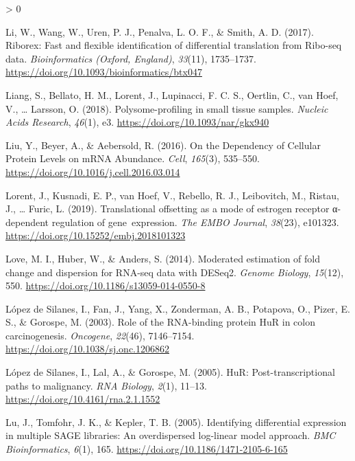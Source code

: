 \documentclass[
  12pt,
  openany]{book}
\newlength{\cslhangindent}
\newenvironment{CSLReferences}[2] %
 {%
  \setlength{\parindent}{0pt}
  \ifodd #1 \everypar{\setlength{\hangindent}{\cslhangindent}}\ignorespaces\fi
  \ifnum #2 > 0
  \setlength{\parskip}{#2\baselineskip}
  \fi
 }%
 {}
\begin{document}
\begin{CSLReferences}{1}{0}
\leavevmode\hypertarget{ref-Li2017}{}%
Li, W., Wang, W., Uren, P. J., Penalva, L. O. F., \& Smith, A. D. (2017). Riborex: Fast and flexible identification of differential translation from {Ribo}-seq data. \emph{Bioinformatics (Oxford, England)}, \emph{33}(11), 1735--1737. \url{https://doi.org/10.1093/bioinformatics/btx047}

\leavevmode\hypertarget{ref-Liang2018}{}%
Liang, S., Bellato, H. M., Lorent, J., Lupinacci, F. C. S., Oertlin, C., van Hoef, V., \ldots{} Larsson, O. (2018). Polysome-profiling in small tissue samples. \emph{Nucleic Acids Research}, \emph{46}(1), e3. \url{https://doi.org/10.1093/nar/gkx940}

\leavevmode\hypertarget{ref-Liu2016}{}%
Liu, Y., Beyer, A., \& Aebersold, R. (2016). On the {Dependency} of {Cellular Protein Levels} on {mRNA Abundance}. \emph{Cell}, \emph{165}(3), 535--550. \url{https://doi.org/10.1016/j.cell.2016.03.014}

\leavevmode\hypertarget{ref-Lorent2019}{}%
Lorent, J., Kusnadi, E. P., van Hoef, V., Rebello, R. J., Leibovitch, M., Ristau, J., \ldots{} Furic, L. (2019). Translational offsetting as a mode of estrogen receptor α-dependent regulation of gene~expression. \emph{The EMBO Journal}, \emph{38}(23), e101323. \url{https://doi.org/10.15252/embj.2018101323}

\leavevmode\hypertarget{ref-Love2014}{}%
Love, M. I., Huber, W., \& Anders, S. (2014). Moderated estimation of fold change and dispersion for {RNA}-seq data with {DESeq2}. \emph{Genome Biology}, \emph{15}(12), 550. \url{https://doi.org/10.1186/s13059-014-0550-8}

\leavevmode\hypertarget{ref-LopezdeSilanes2003}{}%
López de Silanes, I., Fan, J., Yang, X., Zonderman, A. B., Potapova, O., Pizer, E. S., \& Gorospe, M. (2003). Role of the {RNA}-binding protein {HuR} in colon carcinogenesis. \emph{Oncogene}, \emph{22}(46), 7146--7154. \url{https://doi.org/10.1038/sj.onc.1206862}

\leavevmode\hypertarget{ref-LopezdeSilanes2005}{}%
López de Silanes, I., Lal, A., \& Gorospe, M. (2005). {HuR}: Post-transcriptional paths to malignancy. \emph{RNA Biology}, \emph{2}(1), 11--13. \url{https://doi.org/10.4161/rna.2.1.1552}

\leavevmode\hypertarget{ref-Lu2005}{}%
Lu, J., Tomfohr, J. K., \& Kepler, T. B. (2005). Identifying differential expression in multiple {SAGE} libraries: An overdispersed log-linear model approach. \emph{BMC Bioinformatics}, \emph{6}(1), 165. \url{https://doi.org/10.1186/1471-2105-6-165}


\end{CSLReferences}
\end{document}
